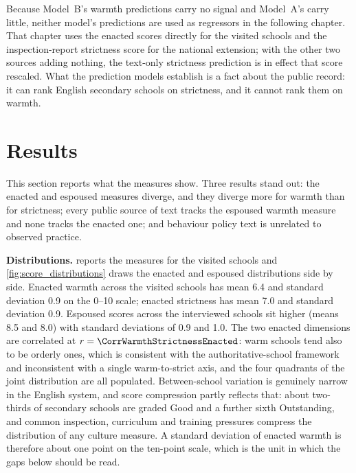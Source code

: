 





Because Model~B's warmth predictions carry no signal and Model~A's carry
little, neither model's predictions are used as regressors in the following
chapter. That chapter uses the enacted scores directly for the visited
schools and the inspection-report strictness score for the national
extension; with the other two sources adding nothing, the text-only
strictness prediction is in effect that score rescaled. What the prediction
models establish is a fact about the public record: it can rank English
secondary schools on strictness, and it cannot rank them on warmth.

\section{Results}
\label{sec:p1_results}

This section reports what the measures show. Three results stand out: the
enacted and espoused measures diverge, and they diverge more for warmth than
for strictness; every public source of text tracks the espoused warmth measure
and none tracks the enacted one; and behaviour policy text is unrelated to
observed practice.

\textbf{Distributions.}  reports the measures for the
visited schools and \cref{fig:score_distributions} draws the enacted and
espoused distributions side by side. Enacted warmth across the \NTierOne{}
visited schools has mean 6.4 and standard deviation 0.9 on the 0--10 scale;
enacted strictness has mean 7.0 and standard deviation 0.9. Espoused scores
across the \NInterviewed{} interviewed schools sit higher (means 8.5 and 8.0)
with standard deviations of 0.9 and 1.0. The two enacted dimensions are
correlated at $r = \CorrWarmthStrictnessEnacted$: warm schools tend also to
be orderly ones, which is consistent with the authoritative-school framework
and inconsistent with a single warm-to-strict axis, and the four quadrants of
the joint distribution are all populated. Between-school variation is
genuinely narrow in the English system, and score compression partly
reflects that: about two-thirds of secondary schools are graded Good and a
further sixth Outstanding, and common inspection, curriculum and training
pressures compress the distribution of any culture measure. A standard
deviation of enacted warmth is therefore about one point on the ten-point
scale, which is the unit in which the gaps below should be read.

